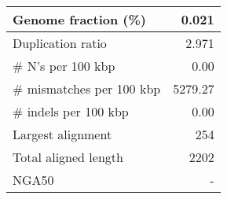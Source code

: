 \documentclass[12pt,a4paper]{article}
\begin{document}
\begin{table}[ht]
\begin{center}
\begin{tabular}{|l*{1}{|r}|}
Genome fraction (\%) & 0.021 \\ \hline
Duplication ratio & 2.971 \\ \hline
\# N's per 100 kbp & 0.00 \\ \hline
\# mismatches per 100 kbp & 5279.27 \\ \hline
\# indels per 100 kbp & 0.00 \\ \hline
Largest alignment & 254 \\ \hline
Total aligned length & 2202 \\ \hline
NGA50 & - \\ \hline
\end{tabular}
\end{center}
\end{table}
\end{document}
